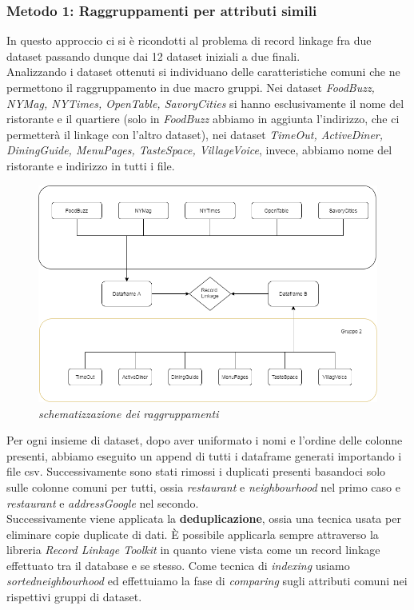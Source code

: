 \documentclass[a4paper,12pt]{article}
\begin{document}
\subsubsection{Metodo 1: Raggruppamenti per attributi simili}
In questo approccio ci si è ricondotti al problema di record linkage fra due dataset passando dunque dai 12 dataset iniziali a due finali.\\

\noindent Analizzando i dataset ottenuti si individuano delle caratteristiche comuni che ne permettono il raggruppamento in due macro gruppi.
Nei dataset \textit{FoodBuzz, NYMag, NYTimes, OpenTable, SavoryCities} si hanno esclusivamente il nome del ristorante e il quartiere (solo in \textit{FoodBuzz} abbiamo in aggiunta l'indirizzo, che ci permetterà il linkage con l'altro dataset), nei dataset \textit{TimeOut, ActiveDiner, DiningGuide, MenuPages, TasteSpace, VillageVoice}, invece, abbiamo nome del ristorante e indirizzo in tutti i file. \\
\begin{figure}[H]
	\centering
	\includegraphics[width=0.9\linewidth]{img/diagramMethod.png}
	\caption{\textit{schematizzazione dei raggruppamenti}}
\end{figure}
\noindent Per ogni insieme di dataset, dopo aver uniformato i nomi e l'ordine delle colonne presenti, abbiamo eseguito un append di tutti i dataframe generati importando i file csv. 
Successivamente sono stati rimossi i duplicati presenti basandoci solo sulle colonne comuni per tutti, ossia \textit{restaurant} e \textit{neighbourhood} nel primo caso e \textit{restaurant} e \textit{addressGoogle} nel secondo. \\

\noindent Successivamente viene applicata la \textbf{deduplicazione}, ossia una tecnica usata per eliminare copie duplicate di dati. È possibile applicarla sempre attraverso la libreria \textit{Record Linkage Toolkit} in quanto viene vista come un record linkage effettuato tra il database e se stesso. Come tecnica di \textit{indexing} usiamo \textit{sortedneighbourhood} ed effettuiamo la fase di \textit{comparing} sugli attributi comuni nei rispettivi gruppi di dataset. \\
\end{document}
